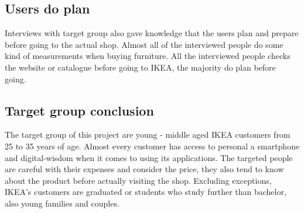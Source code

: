 \subsection{Users do plan}
Interviews with target group also gave knowledge that the users plan and prepare before going to the actual shop. Almost all of the interviewed people do some kind of measurements when buying furniture. All the interviewed people checks the website or catalogue before going to IKEA, the majority do plan before going. 

\subsection{Target group conclusion}
The target group of this project are young - middle aged IKEA customers from 25 to 35 years of age. Almost every customer has access to personal a smartphone and digital-wisdom when it comes to using its applications. The targeted people are careful with their expenses and consider the price, they also tend to know about the product before actually visiting the shop. Excluding exceptions, IKEA's customers are graduated or students who study further than bachelor, also young families and couples.



